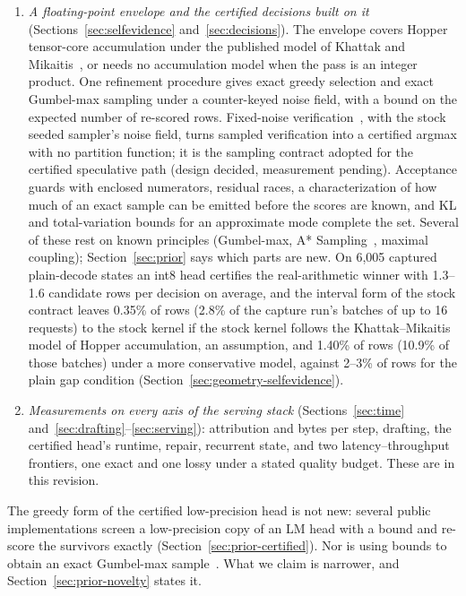 \begin{enumerate}
\item \emph{A floating-point envelope and the certified decisions built on it} (Sections~\ref{sec:selfevidence} and~\ref{sec:decisions}). The envelope covers Hopper tensor-core accumulation under the published model of Khattak and Mikaitis~\cite{khattak2026}, or needs no accumulation model when the pass is an integer product. One refinement procedure gives exact greedy selection and exact Gumbel-max sampling under a counter-keyed noise field, with a bound on the expected number of re-scored rows. Fixed-noise verification~\cite{daliri2025}, with the stock seeded sampler's noise field, turns sampled verification into a certified argmax with no partition function; it is the sampling contract adopted for the certified speculative path (design decided, measurement pending). Acceptance guards with enclosed numerators, residual races, a characterization of how much of an exact sample can be emitted before the scores are known, and KL and total-variation bounds for an approximate mode complete the set. Several of these rest on known principles (Gumbel-max, A* Sampling~\cite{astar}, maximal coupling); Section~\ref{sec:prior} says which parts are new. On 6,005 captured plain-decode states an int8 head certifies the real-arithmetic winner with 1.3--1.6 candidate rows per decision on average, and the interval form of the stock contract leaves 0.35\% of rows (2.8\% of the capture run's batches of up to 16 requests) to the stock kernel if the stock kernel follows the Khattak--Mikaitis model of Hopper accumulation, an assumption, and 1.40\% of rows (10.9\% of those batches) under a more conservative model, against 2--3\% of rows for the plain gap condition (Section~\ref{sec:geometry-selfevidence}).
\item \emph{Measurements on every axis of the serving stack} (Sections~\ref{sec:time} and~\ref{sec:drafting}--\ref{sec:serving}): attribution and bytes per step, drafting, the certified head's runtime, repair, recurrent state, and two latency--throughput frontiers, one exact and one lossy under a stated quality budget. These are \pending{} in this revision.
\end{enumerate}
The greedy form of the certified low-precision head is not new: several public implementations screen a low-precision copy of an LM head with a bound and re-score the survivors exactly (Section~\ref{sec:prior-certified}). Nor is using bounds to obtain an exact Gumbel-max sample~\cite{astar,mussmann2017}. What we claim is narrower, and Section~\ref{sec:prior-novelty} states it.

